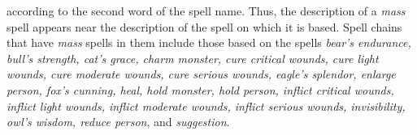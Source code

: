 

according to the second word of the spell name. Thus, the description of a \textit{mass
}spell appears near the description of the spell on which it is based. Spell chains
that have \textit{mass} spells in them include those based on the spells \textit{bear's
endurance, bull's strength, cat's grace, charm monster, cure critical wounds, cure
light wounds, cure moderate wounds, cure serious wounds, eagle's splendor, enlarge
person, fox's cunning, heal, hold monster, hold person, inflict critical wounds,
inflict light wounds, inflict moderate wounds, inflict serious wounds, invisibility,
owl's wisdom, reduce person}, and \textit{suggestion}.